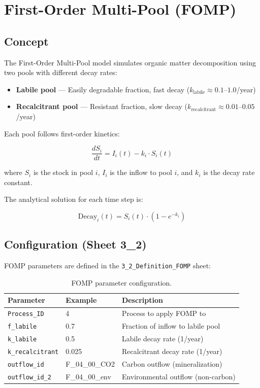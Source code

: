 \chapter{First-Order Multi-Pool (FOMP)}
\label{ch:fomp}

\section{Concept}

The First-Order Multi-Pool model simulates organic matter decomposition using two pools with different decay rates:

\begin{itemize}
  \item \textbf{Labile pool} --- Easily degradable fraction, fast decay ($k_{\text{labile}} \approx 0.1$--$1.0$/year)
  \item \textbf{Recalcitrant pool} --- Resistant fraction, slow decay ($k_{\text{recalcitrant}} \approx 0.01$--$0.05$/year)
\end{itemize}

Each pool follows first-order kinetics:

\begin{equation}
  \frac{dS_i}{dt} = I_i(t) - k_i \cdot S_i(t)
\end{equation}

where $S_i$ is the stock in pool $i$, $I_i$ is the inflow to pool $i$, and $k_i$ is the decay rate constant.

The analytical solution for each time step is:

\begin{equation}
  \text{Decay}_i(t) = S_i(t) \cdot \left(1 - e^{-k_i}\right)
\end{equation}

\section{Configuration (Sheet 3\_2)}

FOMP parameters are defined in the \texttt{3\_2\_Definition\_FOMP} sheet:

\begin{table}[h]
\centering
\begin{tabular}{llp{5.5cm}}
\toprule
\textbf{Parameter} & \textbf{Example} & \textbf{Description} \\
\midrule
\texttt{Process\_ID} & 4 & Process to apply FOMP to \\
\texttt{f\_labile} & 0.7 & Fraction of inflow to labile pool \\
\texttt{k\_labile} & 0.5 & Labile decay rate (1/year) \\
\texttt{k\_recalcitrant} & 0.025 & Recalcitrant decay rate (1/year) \\
\texttt{outflow\_id} & F\_04\_00\_CO2 & Carbon outflow (mineralization) \\
\texttt{outflow\_id\_2} & F\_04\_00\_env & Environmental outflow (non-carbon) \\
\bottomrule
\end{tabular}
\caption{FOMP parameter configuration.}
\end{table}

